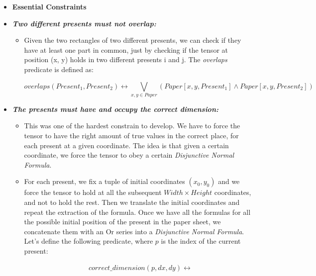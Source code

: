 \begin{itemize}
    \item[] \textbf{Essential Constraints}
    \item \textbf{\textit{Two different presents must not overlap:}}
    \begin{itemize}
        \item[] Given the two rectangles of two different presents, we can check if they have
            at least one part in common, just by checking if the tensor at position (x, y)
            holds in two different presents i and j. The \textit{overlaps} predicate is defined as:
        \begin{adjustwidth}{-2.5cm}{}\begin{equation*}
            overlaps(Present_1, Present_2) \leftrightarrow
            \bigvee_{x, y \in Paper}(Paper[x, y, Present_1] \wedge Paper[x, y, Present_2])
        \end{equation*}\end{adjustwidth}
    \end{itemize}
    \newpage
    \item \textbf{\textit{The presents must have and occupy the correct dimension:}}
    \begin{itemize}
        \item[] This was one of the hardest constrain to develop. We have to force the tensor to have the right
            amount of true values in the correct place, for each present at a given coordinate. The idea is
            that given a certain coordinate, we force the tensor to obey a certain \textit{Disjunctive Normal Formula}.
        \item[] For each present, we fix a tuple of initial coordinates $(x_0, y_0)$ and we force the tensor to hold at 
                all the subsequent $Width \times Height$ coordinates, and not to hold the rest.
                Then we translate the initial coordinates and repeat the extraction of the formula.
                Once we have all the formulas for all the possible initial position of the present in the paper sheet,
                we concatenate them with an Or series into a \textit{Disjunctive Normal Formula}.
                Let's define the following predicate, where $p$ is the index of the current present:
        \begin{adjustwidth}{-2.0cm}{}\begin{equation*}\begin{split}
            &correct\_dimension(p, dx, dy) \leftrightarrow \\

\end{split}
\end{equation*}
\end{adjustwidth}
\end{itemize}
\end{itemize}
